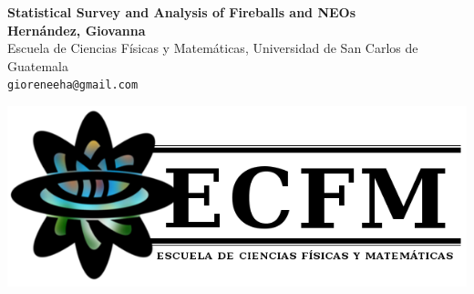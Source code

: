 \documentclass[a1,portrait]{a1poster}
\begin{document}
% 

\begin{minipage}[b]{0.6\linewidth}
\Huge \color{DarkOliveGreen} \textbf{Statistical Survey and Analysis of Fireballs and NEOs} \color{Black}\\ %
\large \textbf{Hernández, Giovanna}\\[0.5cm] %
\large Escuela de Ciencias Físicas y Matemáticas, Universidad de San Carlos de Guatemala\\[0.2cm] %
\texttt{gioreneeha@gmail.com}\\
\end{minipage}
%
\begin{minipage}[b]{0.4\linewidth}
\includegraphics[width=15cm]{ecfmLogoColorO.png}\\
\end{minipage}

\vspace{.5cm} %

\end{document}
